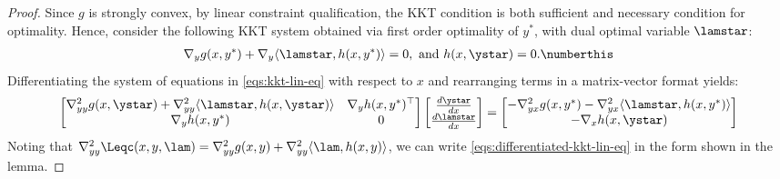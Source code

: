 \begin{proof} 
Since $g$ is strongly convex, by linear
constraint qualification, the KKT condition
is both sufficient and necessary condition for optimality.
Hence, consider the
following KKT system obtained via first order optimality of $y^*$, with dual optimal variable $\lamstar$:
\begin{align*}
    \nabla_y g(x,y^{*})+\nabla_y\langle\lamstar,  h(x,y^{*})\rangle  =0, \text{ and } h(x, \ystar)=0.\numberthis\label{eqs:kkt-lin-eq}
\end{align*}
Differentiating 
the system of equations in \cref{eqs:kkt-lin-eq} with respect to $x$ and rearranging terms in a matrix-vector format yields:
\begin{equation}\label{eqs:differentiated-kkt-lin-eq}
    \begin{aligned}
\begin{bmatrix}\nabla^2_{yy} g(x,\ystar) + \nabla^2_{yy}\langle\lamstar,   h(x,\ystar)\rangle  & \nabla_y h(x,y^{*})^{\top}\\
\nabla_y h(x,y^{*}) & 0
\end{bmatrix}\begin{bmatrix}\frac{d\ystar}{dx}\\
\frac{d\lamstar}{dx}
\end{bmatrix}=\begin{bmatrix}-\nabla^2_{yx}g(x,y^{*})-\nabla^2_{yx}\langle\lamstar, h(x,y^{*})\rangle\\
-\nabla_x h(x,\ystar)\end{bmatrix}
    \end{aligned}
\end{equation}
Noting that $\nabla_{yy}^{2}\Leqc(x,y,\lam)=\nabla^2_{yy} g(x,y)+\nabla^2_{yy}\langle\lam,  h(x,y)\rangle$, we can write \cref{eqs:differentiated-kkt-lin-eq} in the form shown in the lemma.
\end{proof}


